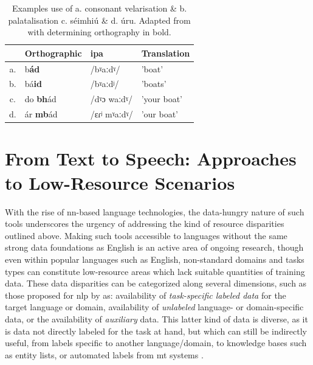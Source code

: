 \documentclass[thesis]{cluu}
\newcommand{\ipa}[1]{{\ipafont #1}}
\begin{document}
\begin{table}[ht]
  \centering
  \caption{Examples use of a. consonant velarisation \& b. palatalisation c. séimhiú \& d. úru. Adapted from \textcite{nichasaideSPEECHTECHNOLOGYDOCUMENTATION2015} with determining orthography in bold.}
  \begin{tabular}{c|l|l|l}
     & Orthographic & \gls{ipa} & Translation \\
    \hline
    a. & b\textbf{ád} & /\ipa{bˠaːdˠ}/ & 'boat' \\
    b. & bá\textbf{id} & /\ipa{bˠaːdʲ}/ & 'boats' \\
    c. & do \textbf{bh}ád & /\ipa{dˠɔ waːdˠ}/ & 'your boat'\\
    d. & ár \textbf{mb}ád & /\ipa{ɛɾʲ mˠaːdˠ}/ & 'our boat'\\
  \end{tabular}
  \label{tab:sound_contrasts}
\end{table}

\section{From Text to Speech: Approaches to Low-Resource Scenarios}\label{lr_scenarios}
With the rise of \gls{nn}-based language technologies, the data-hungry nature of such tools underscores the urgency of addressing the kind of resource disparities outlined above. Making such tools accessible to languages without the same strong data foundations as English is an active area of ongoing research, though even within popular languages such as English, non-standard domains and tasks types can constitute low-resource areas which lack suitable quantities of training data. These data disparities can be categorized along several dimensions, such as those proposed for \gls{nlp} by \textcite{hedderichSurveyRecentApproaches2021} as: availability of \textit{task-specific labeled data} for the target language or domain, availability of \textit{unlabeled} language- or domain-specific data, or the availability of \textit{auxiliary} data. This latter kind of data is diverse, as it is data not directly labeled for the task at hand, but which can still be indirectly useful, from labels specific to another language/domain, to knowledge bases such as entity lists, or automated labels from \gls{mt} systems \parencite{hedderichSurveyRecentApproaches2021}.
\end{document}
